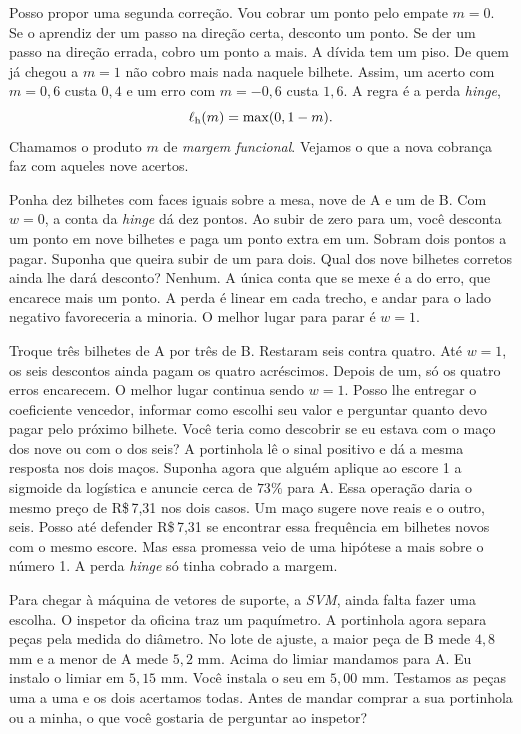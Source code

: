 Posso propor uma segunda correção. Vou cobrar um ponto pelo empate $m=0$. Se o aprendiz der um passo na direção certa, desconto um ponto. Se der um passo na direção errada, cobro um ponto a mais. A dívida tem um piso. De quem já chegou a $m=1$ não cobro mais nada naquele bilhete. Assim, um acerto com $m=0{,}6$ custa $0{,}4$ e um erro com $m=-0{,}6$ custa $1{,}6$. A regra é a perda \emph{hinge},
\[
                  \ell_{\rm h}(m)=\max(0,1-m).
\]
Chamamos o produto $m$ de \emph{margem funcional}. Vejamos o que a nova cobrança faz com aqueles nove acertos.

\perdasmargem

Ponha dez bilhetes com faces iguais sobre a mesa, nove de A e um de B. Com $w=0$, a conta da \emph{hinge} dá dez pontos. Ao subir de zero para um, você desconta um ponto em nove bilhetes e paga um ponto extra em um. Sobram dois pontos a pagar. Suponha que queira subir de um para dois. Qual dos nove bilhetes corretos ainda lhe dará desconto? Nenhum. A única conta que se mexe é a do erro, que encarece mais um ponto. A perda é linear em cada trecho, e andar para o lado negativo favoreceria a minoria. O melhor lugar para parar é $w=1$.

Troque três bilhetes de A por três de B. Restaram seis contra quatro. Até $w=1$, os seis descontos ainda pagam os quatro acréscimos. Depois de um, só os quatro erros encarecem. O melhor lugar continua sendo $w=1$. Posso lhe entregar o coeficiente vencedor, informar como escolhi seu valor e perguntar quanto devo pagar pelo próximo bilhete. Você teria como descobrir se eu estava com o maço dos nove ou com o dos seis? A portinhola lê o sinal positivo e dá a mesma resposta nos dois maços. Suponha agora que alguém aplique ao escore 1 a sigmoide da logística e anuncie cerca de $73\%$ para A. Essa operação daria o mesmo preço de R\$\,7,31 nos dois casos. Um maço sugere nove reais e o outro, seis. Posso até defender R\$\,7,31 se encontrar essa frequência em bilhetes novos com o mesmo escore. Mas essa promessa veio de uma hipótese a mais sobre o número 1. A perda \emph{hinge} só tinha cobrado a margem.

Para chegar à máquina de vetores de suporte, a \emph{SVM}, ainda falta fazer uma escolha. O inspetor da oficina traz um paquímetro. A portinhola agora separa peças pela medida do diâmetro. No lote de ajuste, a maior peça de B mede $4{,}8$ mm e a menor de A mede $5{,}2$ mm. Acima do limiar mandamos para A. Eu instalo o limiar em $5{,}15$ mm. Você instala o seu em $5{,}00$ mm. Testamos as peças uma a uma e os dois acertamos todas. Antes de mandar comprar a sua portinhola ou a minha, o que você gostaria de perguntar ao inspetor?

